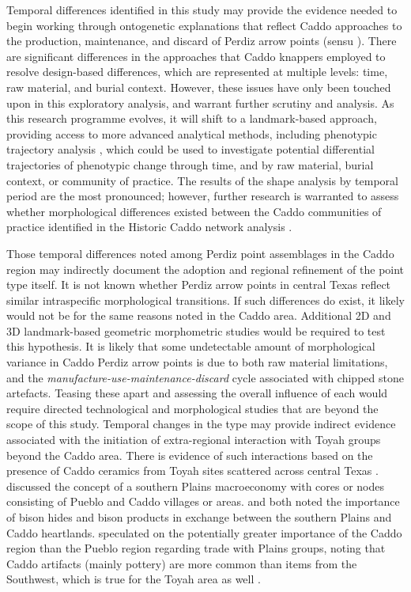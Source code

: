 \documentclass[review]{elsarticle}
\begin{document}
Temporal differences identified in this study may provide the evidence needed to begin working through ontogenetic explanations that reflect Caddo approaches to the production, maintenance, and discard of Perdiz arrow points (sensu \citealt{RN5871}). There are significant differences in the approaches that Caddo knappers employed to resolve design-based differences, which are represented at multiple levels: time, raw material, and burial context. However, these issues have only been touched upon in this exploratory analysis, and warrant further scrutiny and analysis. As this research programme evolves, it will shift to a landmark-based approach, providing access to more advanced analytical methods, including phenotypic trajectory analysis \citep{RN8352,RN8561,RN8544,RN8560}, which could be used to investigate potential differential trajectories of phenotypic change through time, and by raw material, burial context, or community of practice. The results of the shape analysis by temporal period are the most pronounced; however, further research is warranted to assess whether morphological differences existed between the Caddo communities of practice identified in the Historic Caddo network analysis \citep{RN8031}.

Those temporal differences noted among Perdiz point assemblages in the Caddo region may indirectly document the adoption and regional refinement of the point type itself. It is not known whether Perdiz arrow points in central Texas reflect similar intraspecific morphological transitions. If such differences do exist, it likely would not be for the same reasons noted in the Caddo area. Additional 2D and 3D landmark-based geometric morphometric studies would be required to test this hypothesis. It is likely that some undetectable amount of morphological variance in Caddo Perdiz arrow points is due to both raw material limitations, and the \textit{manufacture-use-maintenance-discard} cycle associated with chipped stone artefacts. Teasing these apart and assessing the overall influence of each would require directed technological and morphological studies that are beyond the scope of this study. Temporal changes in the type may provide indirect evidence associated with the initiation of extra-regional interaction with Toyah groups beyond the Caddo area. There is evidence of such interactions based on the presence of Caddo ceramics from Toyah sites scattered across central Texas \citep{RN9001}. \citet{RN6910} discussed the concept of a southern Plains macroeconomy with cores or nodes consisting of Pueblo and Caddo villages or areas. \citet{RN6046} and \citet{RN6910} both noted the importance of bison hides and bison products in exchange between the southern Plains and Caddo heartlands. \citet{RN6910} speculated on the potentially greater importance of the Caddo region than the Pueblo region regarding trade with Plains groups, noting that Caddo artifacts (mainly pottery) are more common than items from the Southwest, which is true for the Toyah area as well \citep{RN8999}.
\end{document}

